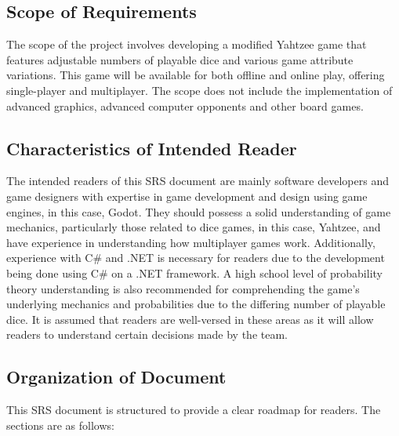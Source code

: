 \subsection{Scope of Requirements} 

The scope of the project involves developing a modified Yahtzee game that features adjustable numbers of playable dice and various game attribute variations. This game will be available for both offline and online play, offering single-player and multiplayer. The scope does not include the implementation of advanced graphics, advanced computer opponents and other board games.

\subsection{Characteristics of Intended Reader} \label{sec_IntendedReader}

The intended readers of this SRS document are mainly software developers and game designers with expertise in game development and design using game engines, in this case, Godot. They should possess a solid understanding of game mechanics, particularly those related to dice games, in this case, Yahtzee, and have experience in understanding how multiplayer games work. Additionally, experience with C\# and .NET is necessary for readers due to the development being done using C\# on a .NET framework. A high school level of probability theory understanding is also recommended for comprehending the game's underlying mechanics and probabilities due to the differing number of playable dice. It is assumed that readers are well-versed in these areas as it will allow readers to understand certain decisions made by the team.

\subsection{Organization of Document}

This SRS document is structured to provide a clear roadmap for readers. The sections are as follows:

